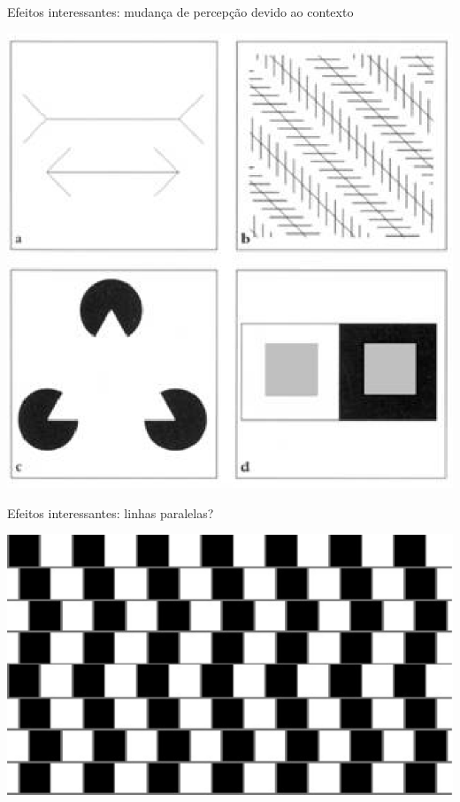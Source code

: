       \begin{slide}[toc=]{Efeitos interessantes: mudança de percepção devido ao contexto}
            \begin{center}
               \includegraphics[height=0.8\textheight]{figs/image003.eps}
            \end{center}
      \end{slide}
      \begin{slide}[toc=]{Efeitos interessantes: linhas paralelas?}
            \begin{center}
               \includegraphics[height=0.8\textheight]{figs/parede.eps}
            \end{center}
      \end{slide}
